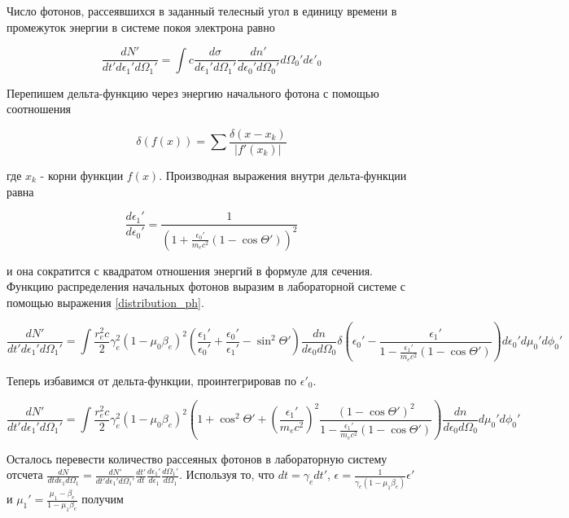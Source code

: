 Число фотонов, рассеявшихся в заданный телесный угол в единицу времени в промежуток энергии в системе покоя электрона равно

\begin{equation}
\frac{dN'}{dt'd\epsilon_1'd\Omega_1'}=\int c \frac{d\sigma}{d\epsilon_1'd\Omega_1'} \frac{dn'}{d\epsilon_0'd\Omega_0'}d\Omega_0'd\epsilon'_0
\end{equation}

Перепишем дельта-функцию через энергию начального фотона с помощью соотношения 

\begin{equation}
	\delta(f(x)) = \sum \frac{\delta(x-x_k)}{|f'(x_k)|}
\end{equation}

где $x_k$ - корни функции $f(x)$. Производная выражения внутри дельта-функции равна

\begin{equation}
	\frac{d\epsilon_1'}{d\epsilon_0'}=\frac{1}{(1+\frac{\epsilon_0'}{m_e c^2}(1 - \cos \Theta'))^2}
\end{equation}

и она сократится с квадратом отношения энергий в формуле для сечения. Функцию распределения начальных фотонов выразим в лабораторной системе с помощью выражения \ref{distribution_ph}.

\begin{equation}
\frac{dN'}{dt'd\epsilon_1'd\Omega_1'}=\int \frac{r_e^2 c}{2} \gamma_e^2 (1 - \mu_0 \beta_e)^2 \left(\frac{\epsilon_1'}{\epsilon_0'}+\frac{\epsilon_0'}{\epsilon_1'}-\sin^2\Theta'\right)\frac{dn}{d\epsilon_0 d\Omega_0} \delta\left(\epsilon_0' - \frac{\epsilon_1'}{1-\frac{\epsilon_1'}{m_e c^2}(1 - \cos \Theta')}\right) d\epsilon_0'd\mu_0' d\phi_0'
\end{equation}

Теперь избавимся от дельта-функции, проинтегрировав по $\epsilon'_0$.

\begin{equation}
\frac{dN'}{dt'd\epsilon_1'd\Omega_1'}=\int \frac{r_e^2 c}{2} \gamma_e^2 (1 - \mu_0 \beta_e)^2 \left(1 + \cos^2\Theta'+\left(\frac{\epsilon_1'}{m_e c^2}\right)^2\frac{(1-\cos\Theta')^2}{1-\frac{\epsilon_1'}{m_e c^2}(1 - \cos \Theta')}\right)\frac{dn}{d\epsilon_0 d\Omega_0}d\mu_0' d\phi_0'
\end{equation}

Осталось перевести количество рассеяных фотонов в лабораторную систему отсчета $\frac{dN}{dt d\epsilon_1 d\Omega_1} = \frac{dN'}{dt' d\epsilon_1' d\Omega_1'}\frac{dt'}{dt}\frac{d\epsilon_1'}{d\epsilon_1}\frac{d\Omega_1'}{d\Omega_1}$. Используя то, что $dt = \gamma_e dt'$, $\epsilon = \frac{1}{\gamma_e(1 -\mu_1\beta_e)}\epsilon'$ и $\mu_1' = \frac{\mu_1-\beta_e}{1-\mu_1 \beta_e}$ получим

